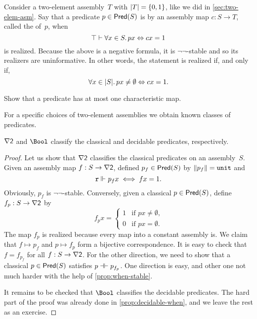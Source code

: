 Consider a two-element assembly~$T$ with $|T| = \{0,1\}$, like we did in \cref{sec:two-elem-asm}. Say that a predicate $p \in \mathsf{Pred}(S)$ is  by an assembly map $c : S \to T$, called the  of~$p$, when
%
\begin{equation*}
  \top \vdash \forall x \in S .\, p x \Leftrightarrow c x = 1
\end{equation*}
%
is realized. Because the above is a negative formula, it is $\neg\neg$-stable and so its realizers are uninformative. In other words, the statement is realized if, and only if,
%
\begin{equation*}
  \forall x \in |S| .\, p x \neq \emptyset \Leftrightarrow c x = 1.
\end{equation*}

\begin{exercise}
  Show that a predicate has at most one characteristic map.
\end{exercise}

For a specific choices of two-element assemblies we obtain known classes of predicates.

\begin{proposition}
  $\nabla \mathsf{2}$ and $\Bool$ classify the classical and decidable predicates, respectively.
\end{proposition}

\begin{proof}
  Let us show that $\nabla \mathsf{2}$ classifies the classical predicates on an assembly~$S$.
  Given an assembly map $f : S \to \nabla \mathsf{2}$, defined $p_f \in \mathsf{Pred}(S)$ by $\|p_f\| = \mathtt{unit}$ and
  \begin{equation*}
    \mathtt{r} \Vdash_{} p_f x
    \iff
    f x = 1.
  \end{equation*}
  Obviously, $p_f$ is $\neg\neg$-stable. Conversely, given a classical $p \in \mathsf{Pred}(S)$, define $f_p : S \to \nabla \mathsf{2}$ by
  \begin{equation*}
    f_p x =
    \begin{cases}
      1 & \text{if $p x \neq \emptyset$,} \\
      0 & \text{if $p x = \emptyset$.}
    \end{cases}
  \end{equation*}
  The map $f_p$ is realized because every map into a constant assembly is.
  We claim that $f \mapsto p_f$ and $p \mapsto f_p$ form a bijective correspondence.
  It is easy to check that $f = f_{p_f}$ for all $f : S \to \nabla \mathsf{2}$.
  For the other direction, we need to show that a classical $p \in \mathsf{Pred}(S)$ satisfies $p \mathrel{{\dashv}{\vdash}} p_{f_p}$. One direction is easy, and other one not much harder with the help of \cref{prop:when-stable}.

  It remains to be checked that $\Bool$ classifies the decidable predicates.
  The hard part of the proof was already done in \cref{prop:decidable-when}, and we leave the rest as an exercise.
\end{proof}

